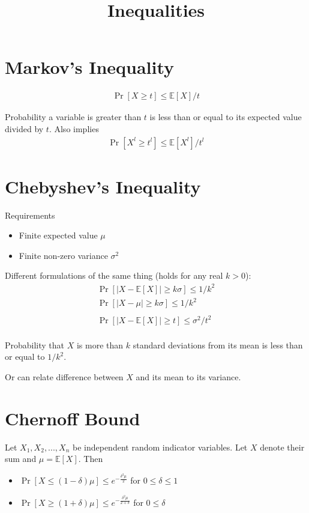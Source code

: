 \documentclass[11pt]{article}
\title{Inequalities}
\newcommand{\eq}[1]{\begin{align*}#1\end{align*}}
\newcommand{\E}[1]{\mathbb{E}[#1]}
\begin{document}
\maketitle

\section{Markov's Inequality}
\eq{
\Pr[X \geq t] \leq \mathbb{E}[X]/t
}

Probability a variable is greater than $t$ is less than or equal to its expected value divided by $t$. Also implies
\eq{
\Pr[X^l \geq t^l] \leq \mathbb{E}[X^l]/t^l
}

\section{Chebyshev's Inequality}
Requirements
\begin{itemize}
\item Finite expected value $\mu$
\item Finite non-zero variance $\sigma^2$
\end{itemize}

Different formulations of the same thing (holds for any real $k > 0$):
\eq{
\Pr[|X - \mathbb{E}[X]| \geq k\sigma] \leq 1/k^2 \\
\Pr[|X - \mu| \geq k\sigma] \leq 1/k^2 \\ \\
\Pr[|X - \mathbb{E}[X]| \geq t] \leq \sigma^2/t^2 \\
}

Probability that $X$ is more than $k$ standard deviations from its mean is less than or equal to $1/k^2$.

Or can relate difference between $X$ and its mean to its variance.

\section{Chernoff Bound}

Let $X_1, X_2, ..., X_n$ be independent random indicator variables. Let $X$ denote their sum and $\mu = \E{X}$. Then

\begin{itemize}
\item $\Pr[X \leq (1 - \delta)\mu] \leq e^{-\frac{\delta^2\mu}{2}}$ for $0 \leq \delta \leq 1$
\item $\Pr[X \geq (1 + \delta)\mu] \leq e^{-\frac{\delta^2\mu}{2+\delta}}$ for $0 \leq \delta$
\end{itemize}
\end{document}
